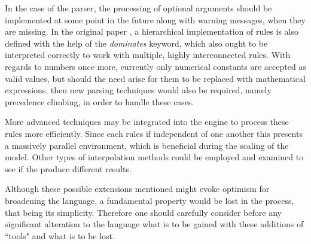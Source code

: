 In the case of the parser, the processing of optional arguments should be implemented at some point in the future along with warning messages, when they are missing. In the original paper \cite{pillerkovacs2015}, a hierarchical implementation of rules is also defined with the help of the \textit{dominates} keyword, which also ought to be interpreted correctly to work with multiple, highly interconnected rules. With regards to numbers once more, currently only numerical constants are accepted as valid values, but should the need arise for them to be replaced with mathematical expressions, then new parsing techniques would also be required, namely precedence climbing, in order to handle these cases.

More advanced techniques may be integrated into the engine to process these rules more efficiently. Since each rules if independent of one another this presents a massively parallel environment, which is beneficial during the scaling of the model. Other types of interpolation methods could be employed and examined to see if the produce different results.

Although these possible extensions mentioned might evoke optimism for broadening the language, a fundamental property would be lost in the process, that being its simplicity. Therefore one should carefully consider before any significant alteration to the language what is to be gained with these additions of ``tools" and what is to be lost.